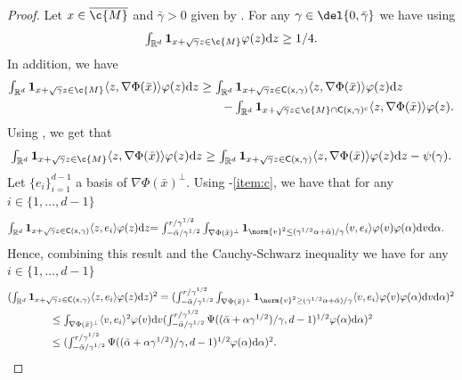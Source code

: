 \begin{proof}
	Let $x \in \cl{\c{M}}$ and $\bar{\gamma} >0$ given by .
	For any $\gamma \in \del{0, \bar{\gamma}}$ we have using  \begin{equation} \label{eq:lowr} \textstyle{\int_{\R^d} \bm{1}_{x + \sqrt{\gamma} z \in \c{M}} \varphi(z) \mathrm{d} z \geq 1/4 .
		}
	\end{equation}
	In addition, we have \begin{align} \textstyle{\int_{\R^d} \bm{1}_{x + \sqrt{\gamma}z \in \c{M}} \langle z, \nabla \Phi(\bar{x}) \rangle \varphi(z) \mathrm{d} z} & \geq \textstyle{ \int_{\R^d} \bm{1}_{x + \sqrt{\gamma}z \in \sf{C}(x,\gamma)} \langle z, \nabla \Phi(\bar{x}) \rangle \varphi(z) \mathrm{d} z} \\ & \qquad \textstyle{-\int_{\R^d} \bm{1}_{x + \sqrt{\gamma}z \in \c{M} \cap \sf{C}(x,\gamma)^\mathrm{c}} \langle z, \nabla \Phi(\bar{x}) \rangle \varphi(z) }.
	\end{align}
	Using , we get that \begin{equation} \label{eq:ineq_remove} \textstyle{\int_{\R^d} \bm{1}_{x + \sqrt{\gamma}z \in \c{M}} \langle z, \nabla \Phi(\bar{x}) \rangle \varphi(z) \mathrm{d} z} \geq \textstyle{ \int_{\R^d} \bm{1}_{x + \sqrt{\gamma}z \in \sf{C}(x,\gamma)} \langle z, \nabla \Phi(\bar{x}) \rangle \varphi(z) \mathrm{d} z} - \psi(\gamma) .
	\end{equation}
	Let $\{e_i \}_{i=1}^{d-1}$ a basis of $\nabla \Phi(\bar{x})^\perp$.
	Using -\ref{item:c}, we have that for any $i \in \{1, \dots, d-1\}$ \begin{align} \textstyle{ \int_{\R^d} \bm{1}_{x + \sqrt{\gamma}z \in \sf{C}(x,\gamma)} \langle z, e_i \rangle \varphi(z) \mathrm{d} z} & \textstyle{= \int_{-\bar{\alpha}/\gamma^{1/2}}^{r/\gamma^{1/2}} \int_{\nabla \Phi(\bar{x})^\perp} \bm{1}_{\norm{v}^2 \leq (\gamma^{1/2} \alpha + \bar{\alpha})/\gamma} \langle v, e_i \rangle \varphi(v) \varphi(\alpha) \mathrm{d} v \mathrm{d} \alpha}.
	\end{align}
	Hence, combining this result and the Cauchy-Schwarz inequality we have for any $i \in \{1, \dots, d-1\}$ \begin{align} \textstyle & \textstyle (\int_{\R^d} \bm{1}_{x + \sqrt{\gamma}z \in \sf{C}(x,\gamma)} \langle z, e_i \rangle \varphi(z) \mathrm{d} z)^2 = \textstyle (\int_{-\bar{\alpha}/\gamma^{1/2}}^{r/\gamma^{1/2}} \int_{\nabla \Phi(\bar{x})^\perp} \bm{1}_{\norm{v}^2 \geq (\gamma^{1/2} \alpha + \bar{\alpha})/\gamma} \langle v, e_i \rangle \varphi(v) \varphi(\alpha) \mathrm{d} v \mathrm{d} \alpha)^2 \\ &\qquad \qquad \leq \textstyle \int_{\nabla \Phi(\bar{x})^\perp} \langle v, e_i \rangle^2 \varphi(v) \mathrm{d} v (\int_{-\bar{\alpha}/\gamma^{1/2}}^{r/\gamma^{1/2}} \Psi((\bar{\alpha} + \alpha\gamma^{1/2})/\gamma, d-1)^{1/2} \varphi(\alpha) \mathrm{d} \alpha )^2 \\ &\qquad \qquad \textstyle \leq (\int_{-\bar{\alpha}/\gamma^{1/2}}^{r/\gamma^{1/2}} \Psi((\bar{\alpha} + \alpha\gamma^{1/2})/\gamma, d-1)^{1/2} \varphi(\alpha) \mathrm{d} \alpha )^2 .

\end{align}
\end{proof}
